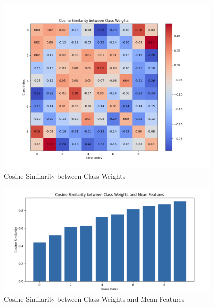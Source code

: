 \documentclass{article}
\begin{document}
\begin{multicols}{2}
\columnbreak
\begin{figure}[H]
\centering
\includegraphics[width=\linewidth]{Plot/VS/stage/cos_VS_5000_50_epoch_199.png}
\caption{Cosine Similarity between Class Weights}
\end{figure}
\begin{figure}[H]
\centering
\includegraphics[width=\linewidth]{Plot/VS_res50/Wi_Hi_res50.png}
\caption{Cosine Similarity between Class Weights and Mean Features}
\end{figure}

\end{multicols} %



\newpage
\end{document}
